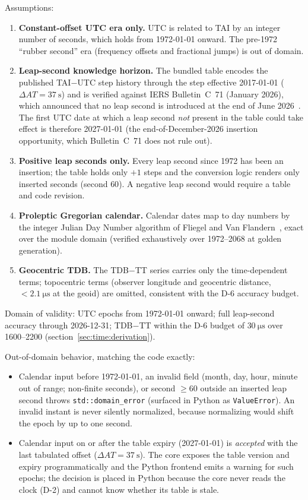 Assumptions:
\begin{enumerate}
  \item \textbf{Constant-offset UTC era only.} UTC is related to TAI by an
    integer number of seconds, which holds from 1972-01-01 onward. The
    pre-1972 ``rubber second'' era (frequency offsets and fractional jumps)
    is out of domain.
  \item \textbf{Leap-second knowledge horizon.} The bundled table encodes
    the published TAI$-$UTC step history through the step effective
    2017-01-01 ($\Delta AT = \qty{37}{\second}$) and is verified against
    IERS Bulletin~C~71 (January 2026), which announced that no leap second
    is introduced at the end of June 2026~\cite{iersbc71}. The first UTC
    date at which a leap second \emph{not} present in the table could take
    effect is therefore 2027-01-01 (the end-of-December-2026 insertion
    opportunity, which Bulletin~C~71 does not rule out).
  \item \textbf{Positive leap seconds only.} Every leap second since 1972
    has been an insertion; the table holds only $+1$ steps and the
    conversion logic renders only inserted seconds (second $60$). A
    negative leap second would require a table and code revision.
  \item \textbf{Proleptic Gregorian calendar.} Calendar dates map to day
    numbers by the integer Julian Day Number algorithm of Fliegel and Van
    Flandern~\cite{fliegel1968}, exact over the module domain (verified
    exhaustively over 1972--2068 at golden generation).
  \item \textbf{Geocentric TDB.} The TDB$-$TT series carries only the
    time-dependent terms; topocentric terms (observer longitude and
    geocentric distance, $<\qty{2.1}{\micro\second}$ at the geoid) are
    omitted, consistent with the D-6 accuracy budget.
\end{enumerate}

Domain of validity: UTC epochs from 1972-01-01 onward; full leap-second
accuracy through 2026-12-31; TDB$-$TT within the D-6 budget of
$\qty{30}{\micro\second}$ over 1600--2200 (section~\ref{sec:time:derivation}).

Out-of-domain behavior, matching the code exactly:
\begin{itemize}
  \item Calendar input before 1972-01-01, an invalid field (month, day,
    hour, minute out of range; non-finite seconds), or second
    ${}\geq 60$ outside an inserted leap second throws
    \texttt{std::domain\_error} (surfaced in Python as
    \texttt{ValueError}). An invalid instant is never silently normalized,
    because normalizing would shift the epoch by up to one second.
  \item Calendar input on or after the table expiry (2027-01-01) is
    \emph{accepted} with the last tabulated offset
    ($\Delta AT = \qty{37}{\second}$). The core exposes the table version
    and expiry programmatically and the Python frontend emits a warning for
    such epochs; the decision is placed in Python because the core never
    reads the clock (D-2) and cannot know whether its table is stale.
\end{itemize}

